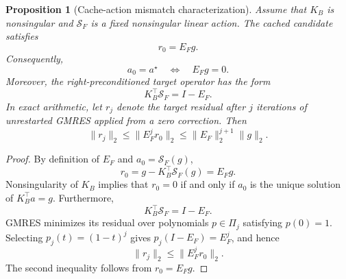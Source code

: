 \documentclass[letterpaper,10pt,conference]{ieeeconf}
\newtheorem{proposition}{Proposition}
\begin{document}
\begin{proposition}[Cache-action mismatch characterization]
\label{prop:mismatch_dependent_correction}
Assume that $K_B$ is nonsingular and $\mathcal S_F$ is a fixed
nonsingular linear action. The cached candidate
satisfies
\begin{equation}
r_0=E_Fg.
\label{eq:directional_candidate_residual}
\end{equation}
Consequently,
\begin{equation}
a_0=a^\star
\quad\Longleftrightarrow\quad
E_Fg=0.
\label{eq:direction_wise_exact_reuse}
\end{equation}
Moreover, the right-preconditioned target operator has the form
\begin{equation}
K_B^\top\mathcal S_F=I-E_F.
\label{eq:preconditioned_mismatch_form}
\end{equation}
In exact arithmetic, let $r_j$ denote the target residual after $j$
iterations of unrestarted GMRES applied from a zero correction. Then
\begin{equation}
\|r_j\|_2
\leq
\|E_F^j r_0\|_2
\leq
\|E_F\|_2^{j+1}\|g\|_2.
\label{eq:mismatch_dependent_residual_bound}
\end{equation}
\end{proposition}
\begin{proof}
By definition of $E_F$ and $a_0=\mathcal S_F(g)$,
\[
r_0
=
g-K_B^\top\mathcal S_F(g)
=
E_Fg.
\]
Nonsingularity of $K_B$ implies that $r_0=0$ if and only if
$a_0$ is the unique solution of $K_B^\top a=g$. Furthermore,
\[
K_B^\top\mathcal S_F
=
I-E_F.
\]
GMRES minimizes its residual over polynomials
$p\in\Pi_j$ satisfying $p(0)=1$. Selecting
$p_j(t)=(1-t)^j$ gives
$p_j(I-E_F)=E_F^j$, and hence
\[
\|r_j\|_2
\leq
\|E_F^j r_0\|_2.
\]
The second inequality follows from $r_0=E_Fg$.
\end{proof}
\end{document}
